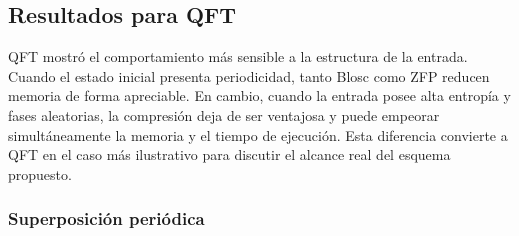 \subsection{Resultados para QFT}

QFT mostró el comportamiento más sensible a la estructura de la entrada. Cuando el estado
inicial presenta periodicidad, tanto Blosc como ZFP reducen memoria de forma apreciable. En
cambio, cuando la entrada posee alta entropía y fases aleatorias, la compresión deja de ser
ventajosa y puede empeorar simultáneamente la memoria y el tiempo de ejecución. Esta
diferencia convierte a QFT en el caso más ilustrativo para discutir el alcance real del
esquema propuesto.

\subsubsection{Superposición periódica}

\begin{table}[H]
    \centering
    \small
    \setlength{\tabcolsep}{3pt}
    \caption{QFT con superposición periódica}
    \label{tab:qft-pattern-results}
\end{table}

